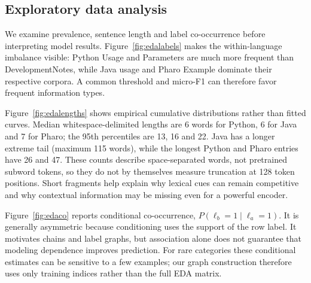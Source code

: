 \subsection{Exploratory data analysis}\label{sec:eda}
We examine prevalence, sentence length and label co-occurrence before interpreting model results. Figure~\ref{fig:edalabels} makes the within-language imbalance visible: Python Usage and Parameters are much more frequent than DevelopmentNotes, while Java usage and Pharo Example dominate their respective corpora. A common threshold and micro-F1 can therefore favor frequent information types.

Figure~\ref{fig:edalengths} shows empirical cumulative distributions rather than fitted curves. Median whitespace-delimited lengths are 6 words for Python, 6 for Java and 7 for Pharo; the 95th percentiles are 13, 16 and 22. Java has a longer extreme tail (maximum 115 words), while the longest Python and Pharo entries have 26 and 47. These counts describe space-separated words, not pretrained subword tokens, so they do not by themselves measure truncation at 128 token positions. Short fragments help explain why lexical cues can remain competitive and why contextual information may be missing even for a powerful encoder.

Figure~\ref{fig:edaco} reports conditional co-occurrence, $P(\ell_b=1\mid\ell_a=1)$. It is generally asymmetric because conditioning uses the support of the row label. It motivates chains and label graphs, but association alone does not guarantee that modeling dependence improves prediction. For rare categories these conditional estimates can be sensitive to a few examples; our graph construction therefore uses only training indices rather than the full EDA matrix.
